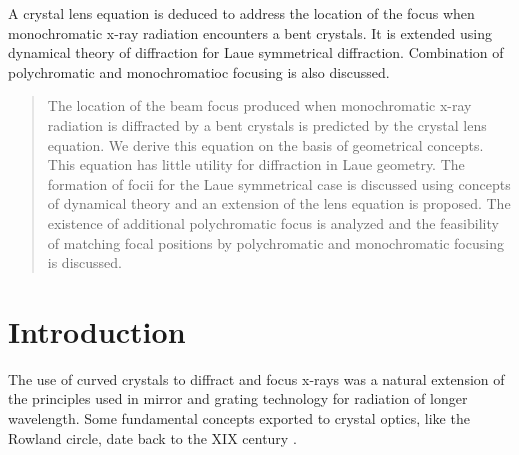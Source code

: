 \documentclass[preprint]{iucr}              %
\begin{document}
\maketitle                        %

\begin{synopsis}
A crystal lens equation is deduced to address the location of the focus when monochromatic x-ray radiation encounters a bent crystals. It is extended using dynamical theory of diffraction for Laue symmetrical diffraction. Combination of polychromatic and monochromatioc focusing is also discussed. 
\end{synopsis}

\begin{abstract}
The location of the beam focus produced when monochromatic x-ray radiation is diffracted by a bent crystals is predicted by the crystal lens equation. We derive this equation on the basis of geometrical concepts. This equation has little utility for diffraction in Laue geometry. The formation of focii for the Laue symmetrical case is discussed using concepts of dynamical theory and an extension of the lens equation is proposed. The existence of additional polychromatic focus is analyzed and the feasibility of matching focal positions by polychromatic and monochromatic focusing is discussed.   
\end{abstract}



\section{Introduction}

The use of curved crystals to diffract and focus x-rays was a natural extension of the principles used in mirror and grating technology for radiation of longer wavelength. Some fundamental concepts exported to crystal optics, like the Rowland circle, date back to the XIX century \cite{rowland1882}.
\end{document}
